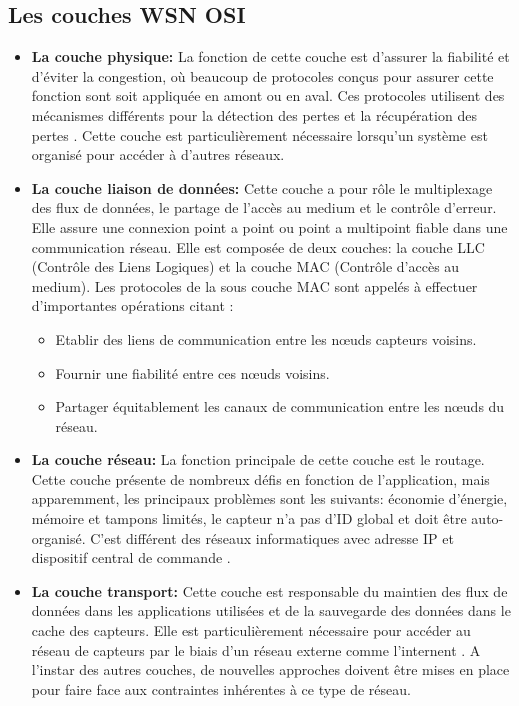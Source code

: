 \subsection{Les couches WSN OSI}
\begin{itemize}
	\item \textbf{La couche physique: }La fonction de cette couche est d'assurer la fiabilité et d’éviter la congestion, où beaucoup de protocoles conçus pour assurer cette fonction sont soit appliquée en amont ou en aval. Ces protocoles utilisent des mécanismes différents pour la détection des pertes et la récupération des pertes \cite{pereira2007end,koubaa2005lower}. Cette couche est particulièrement nécessaire lorsqu'un système est organisé pour accéder à d'autres réseaux.
	
	\item \textbf{La couche liaison de données: }Cette couche a pour rôle le multiplexage des flux de données, le partage de l’accès au medium et le contrôle d’erreur. Elle assure une connexion point a point ou point a multipoint fiable dans une communication réseau. \cite{bachir2010mac,meghan2009comparative} Elle est composée de deux couches: la couche LLC (Contrôle des Liens Logiques) et la couche MAC (Contrôle d’accès au medium). Les protocoles de la sous couche MAC sont appelés à effectuer d’importantes opérations citant :
	\begin{itemize}
		\item Etablir des liens de communication entre les nœuds capteurs voisins.
		\item Fournir une fiabilité entre ces nœuds voisins.
		\item Partager équitablement les canaux de communication entre les nœuds du 		réseau.
	\end{itemize}

	\item \textbf{La couche réseau: }La fonction principale de cette couche est le routage. Cette couche présente de nombreux défis en fonction de l’application, mais apparemment, les principaux problèmes sont les suivants: économie d’énergie, mémoire et tampons limités, le capteur n’a pas d’ID global et doit être auto-organisé. C’est différent des réseaux informatiques avec adresse IP et dispositif central de commande \cite{akyildiz2002wireless,akyildiz2007survey}.
	
	\item \textbf{La couche transport:  }Cette couche est responsable du maintien des flux de données dans les applications utilisées et de la sauvegarde des données dans le cache des capteurs. Elle est particulièrement nécessaire pour accéder au réseau de capteurs par le biais d’un réseau externe comme l’internent \cite{nieberg2003collaborative}. A l’instar des autres couches, de nouvelles approches doivent être mises en place pour faire face aux contraintes inhérentes à ce type de réseau.
	

\end{itemize}
